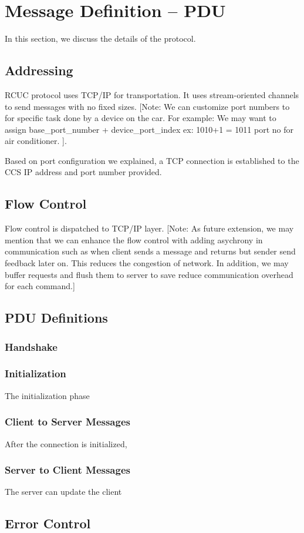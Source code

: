 \section{Message Definition -- PDU}
\label{sec:pdus}

In this section, we discuss the details of the  protocol.

\subsection{Addressing}
\label{sec:pdus:addr}
\textsf{RCUC} protocol uses TCP/IP for transportation. It uses stream-oriented channels to send messages with no fixed sizes. [Note: We can customize port numbers to for specific task done by a device on the car. For example: We may want to assign base\_port\_number + device\_port\_index ex: 1010+1 = 1011 port no for air conditioner. ].

Based on port configuration we explained, a TCP connection is established to the \textsf{CCS} IP address and port number provided.
\subsection{Flow Control}
\label{sec:pdus:flow}
Flow control is dispatched to TCP/IP layer. [Note: As future extension, we may mention that we can enhance the flow control with adding asychrony in communication such as when client sends a message  and returns but sender send feedback later on. This reduces the congestion of network. In addition, we may buffer requests and flush them to server to save reduce communication overhead for each command.]

\subsection{PDU Definitions}
\label{sec:pdus:pdu}


\subsubsection{Handshake}
\label{sec:pdus:pdu:hs}


\subsubsection{Initialization}
\label{sec:pdus:pdu:init}

The initialization phase


\subsubsection{Client to Server Messages}
\label{sec:pdus:pdu:c_to_s}

After the connection is initialized,

\subsubsection{Server to Client Messages}
\label{sec:pdus:pdu:s_to_c}

The server can update the client 
\subsection{Error Control}
\label{sec:pdus:err}


